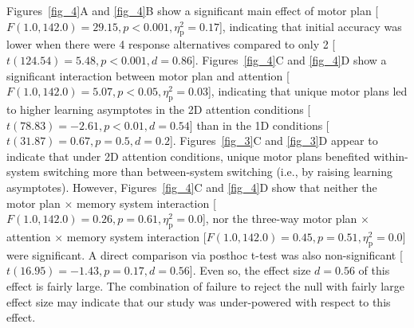 \documentclass[doc, floatsintext]{apa7}
\begin{document}

Figures~\ref{fig_4}A and \ref{fig_4}B show a significant
main effect of motor plan [$F(1.0, 142.0) = 29.15, p <
0.001, \eta_{\text{p}}^{2} = 0.17$], indicating that initial
accuracy was lower when there were 4 response alternatives
compared to only 2 [$t(124.54) = 5.48, p < 0.001, d =
0.86$]. Figures~\ref{fig_4}C and \ref{fig_4}D show a
significant interaction between motor plan and attention
[$F(1.0, 142.0) = 5.07, p < 0.05, \eta_{\text{p}}^{2} =
0.03$], indicating that unique motor plans led to higher
learning asymptotes in the 2D attention conditions
[$t(78.83) = -2.61, p < 0.01, d = 0.54$] than in the 1D
conditions [$t(31.87) = 0.67, p = 0.5, d = 0.2$].
Figures~\ref{fig_3}C and \ref{fig_3}D appear to indicate
that under 2D attention conditions, unique motor plans
benefited within-system switching more than between-system
switching (i.e., by raising learning asymptotes). However,
Figures~\ref{fig_4}C and \ref{fig_4}D show that neither the
motor plan $\times$ memory system interaction [$F(1.0,
142.0) = 0.26, p = 0.61, \eta_{\text{p}}^{2} = 0.0$], nor
the three-way motor plan $\times$ attention $\times$ memory
system interaction [$F(1.0, 142.0) = 0.45, p = 0.51,
\eta_{\text{p}}^{2} = 0.0$] were significant. A direct
comparison via posthoc t-test was also non-significant
[$t(16.95) = -1.43, p = 0.17, d = 0.56$]. Even so, the
effect size $d=0.56$ of this effect is fairly large. The
combination of failure to reject the null with fairly large
effect size may indicate that our study was under-powered
with respect to this effect.

%
%
\end{document}
